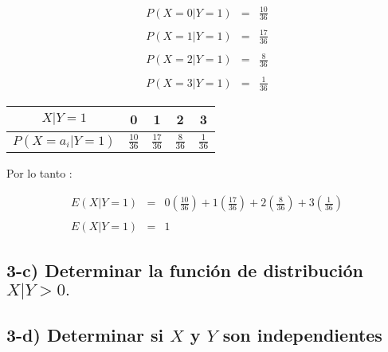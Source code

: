 \documentclass[12pt]{article}
\begin{document}
\begin{equation*}
    \begin{array}{rcl}
        P\left(X = 0|Y = 1\right) & = & \displaystyle \frac{10}{36}
        \\
        \\
        P\left(X = 1|Y = 1\right) & = & \displaystyle \frac{17}{36}
        \\
        \\
        P\left(X = 2|Y = 1\right) & = & \displaystyle \frac{8}{36}
        \\
        \\
        P\left(X = 3|Y = 1\right) & = & \displaystyle \frac{1}{36}
    \end{array}
\end{equation*}


\begin{center}
    \renewcommand{\arraystretch}{1.5}
    \begin{tabular}{|c|c|c|c|c|}
        \hline
        $X|Y = 1$                      & 0               & 1               & 2              & 3
        \\
        \hline
        $P\left(X = a_i| Y = 1\right)$ & $\frac{10}{36}$ & $\frac{17}{36}$ & $\frac{8}{36}$ & $\frac{1}{36}$
        \\
        \hline
    \end{tabular}
\end{center}


Por lo tanto :

\begin{equation*}
    \begin{array}{rcl}
        E\left(X|Y = 1\right) & = & \displaystyle 0  \left(\frac{10}{36}\right) + 1 \left(\frac{17}{36} \right) + 2 \left(\frac{8}{36}\right)  + 3 \left( \frac{1}{36} \right)
        \\
        \\
        E\left(X|Y = 1\right) & = & 1
    \end{array}
\end{equation*}

\subsection*{3-c) Determinar la funci\'on de distribuci\'on $ X | Y > 0.$}


\subsection*{3-d) Determinar si $X$ y $Y$ son independientes}
\end{document}
